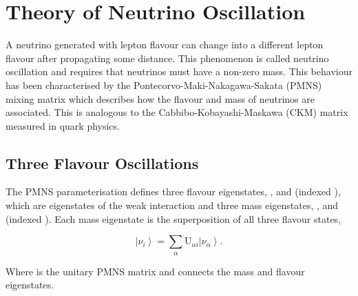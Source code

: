 \section{Theory of Neutrino Oscillation}
\label{sec:NeutrinoOscillationPhysics_EvidenceForNeutrinoOscillation}

A neutrino generated with lepton flavour \quickmath{\alpha} can change into a different lepton flavour \quickmath{\beta} after propagating some distance. This phenomenon is called neutrino oscillation and requires that neutrinos must have a non-zero mass. This behaviour has been characterised by the Pontecorvo-Maki-Nakagawa-Sakata (PMNS) \cite{p1,p2,km} mixing matrix which describes how the flavour and mass of neutrinos are associated. This is analogous to the Cabbibo-Kobayashi-Maskawa (CKM) \cite{cabbibo} matrix measured in quark physics.

\subsection{Three Flavour Oscillations}
\label{sec:NeutrinoOscillationPhysics_3FlavourOsc}

The PMNS parameterisation defines three flavour eigenstates, , \quickmath{\nu_{\mu}} and \quickmath{\nu_{\tau}} (indexed \quickmath{\nu_{\alpha}}), which are eigenstates of the weak interaction and three mass eigenstates, ,  and  (indexed ). Each mass eigenstate is the superposition of all three flavour states,

\begin{equation}
  \label{eq:NeutrinoOscillationPhysics_Superposition}
  \left|\nu_{i}\right> = \sum_{\alpha}\mathrm{U}_{\alpha i}\left|\nu_{\alpha}\right>.
\end{equation}

Where  is the  unitary PMNS matrix and connects the mass and flavour eigenstates.

%

%

